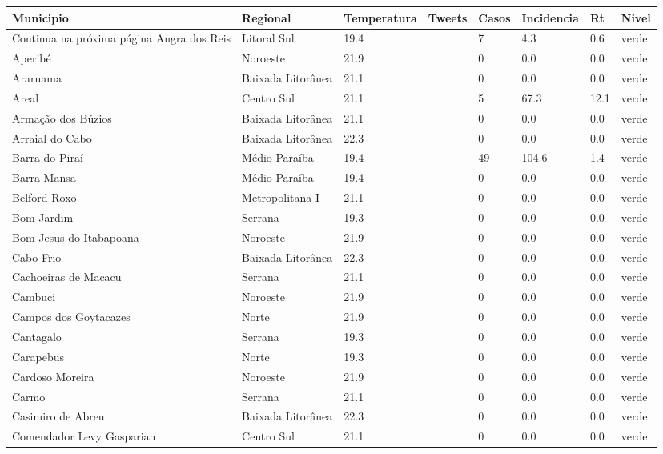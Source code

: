 \begin{longtable}{l|lllllll}
  \hline
Municipio & Regional & Temperatura & Tweets & Casos & Incidencia & Rt & Nivel \\ 
  \hline
\endhead
\hline
{\footnotesize Continua na próxima página}
\endfoot
\endlastfoot
Angra dos Reis & Litoral Sul & 19.4 &  & 7 & 4.3 & 0.6 & verde \\ 
  Aperibé & Noroeste & 21.9 &  & 0 & 0.0 & 0.0 & verde \\ 
  Araruama & Baixada Litorânea & 21.1 &  & 0 & 0.0 & 0.0 & verde \\ 
  Areal & Centro Sul & 21.1 &  & 5 & 67.3 & 12.1 & verde \\ 
  Armação dos Búzios & Baixada Litorânea & 21.1 &  & 0 & 0.0 & 0.0 & verde \\ 
  Arraial do Cabo & Baixada Litorânea & 22.3 &  & 0 & 0.0 & 0.0 & verde \\ 
  Barra do Piraí & Médio Paraíba & 19.4 &  & 49 & 104.6 & 1.4 & verde \\ 
  Barra Mansa & Médio Paraíba & 19.4 &  & 0 & 0.0 & 0.0 & verde \\ 
  Belford Roxo & Metropolitana I & 21.1 &  & 0 & 0.0 & 0.0 & verde \\ 
  Bom Jardim & Serrana & 19.3 &  & 0 & 0.0 & 0.0 & verde \\ 
  Bom Jesus do Itabapoana & Noroeste & 21.9 &  & 0 & 0.0 & 0.0 & verde \\ 
  Cabo Frio & Baixada Litorânea & 22.3 &  & 0 & 0.0 & 0.0 & verde \\ 
  Cachoeiras de Macacu & Serrana & 21.1 &  & 0 & 0.0 & 0.0 & verde \\ 
  Cambuci & Noroeste & 21.9 &  & 0 & 0.0 & 0.0 & verde \\ 
  Campos dos Goytacazes & Norte & 21.9 &  & 0 & 0.0 & 0.0 & verde \\ 
  Cantagalo & Serrana & 19.3 &  & 0 & 0.0 & 0.0 & verde \\ 
  Carapebus & Norte & 19.3 &  & 0 & 0.0 & 0.0 & verde \\ 
  Cardoso Moreira & Noroeste & 21.9 &  & 0 & 0.0 & 0.0 & verde \\ 
  Carmo & Serrana & 21.1 &  & 0 & 0.0 & 0.0 & verde \\ 
  Casimiro de Abreu & Baixada Litorânea & 22.3 &  & 0 & 0.0 & 0.0 & verde \\ 
  Comendador Levy Gasparian & Centro Sul & 21.1 &  & 0 & 0.0 & 0.0 & verde \\ 

\end{longtable}
